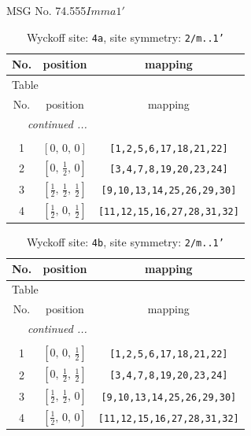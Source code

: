 \documentclass[fleqn,8pt]{jsarticle}
\begin{document}
\setcounter{MaxMatrixCols}{32}

\renewcommand{\tablename}{Table~}
\renewcommand{\figurename}{Figure~}
\begin{center}
\LARGE
MSG No. 74.555\quad$Imma1'$
\end{center}
\renewcommand{\arraystretch}{1.2}
\begin{longtable}{ccc}
\caption{Wyckoff site: {\tt 4a}, site symmetry: {\tt 2/m..1'}}
 \\
 \hline \hline
No. & position & mapping \\ \hline \endfirsthead

\multicolumn{2}{l}{\tablename\ \thetable{}} \\
 \hline \hline
No. & position & mapping \\ \hline \endhead

 \hline \hline
\multicolumn{2}{r}{\footnotesize\it continued ...} \\ \endfoot

 \hline \hline
\multicolumn{2}{r}{} \\ \endlastfoot

1 & $\left[ 0,\, 0,\, 0 \right]$ & {\tt [1,2,5,6,17,18,21,22]} \\ \hline
2 & $\left[ 0,\, \frac{1}{2},\, 0 \right]$ & {\tt [3,4,7,8,19,20,23,24]} \\ \hline
3 & $\left[ \frac{1}{2},\, \frac{1}{2},\, \frac{1}{2} \right]$ & {\tt [9,10,13,14,25,26,29,30]} \\ \hline
4 & $\left[ \frac{1}{2},\, 0,\, \frac{1}{2} \right]$ & {\tt [11,12,15,16,27,28,31,32]} \\
\end{longtable}
\renewcommand{\arraystretch}{1.2}
\begin{longtable}{ccc}
\caption{Wyckoff site: {\tt 4b}, site symmetry: {\tt 2/m..1'}}
 \\
 \hline \hline
No. & position & mapping \\ \hline \endfirsthead

\multicolumn{2}{l}{\tablename\ \thetable{}} \\
 \hline \hline
No. & position & mapping \\ \hline \endhead

 \hline \hline
\multicolumn{2}{r}{\footnotesize\it continued ...} \\ \endfoot

 \hline \hline
\multicolumn{2}{r}{} \\ \endlastfoot

1 & $\left[ 0,\, 0,\, \frac{1}{2} \right]$ & {\tt [1,2,5,6,17,18,21,22]} \\ \hline
2 & $\left[ 0,\, \frac{1}{2},\, \frac{1}{2} \right]$ & {\tt [3,4,7,8,19,20,23,24]} \\ \hline
3 & $\left[ \frac{1}{2},\, \frac{1}{2},\, 0 \right]$ & {\tt [9,10,13,14,25,26,29,30]} \\ \hline
4 & $\left[ \frac{1}{2},\, 0,\, 0 \right]$ & {\tt [11,12,15,16,27,28,31,32]} \\
\end{longtable}
\end{document}
